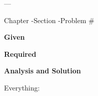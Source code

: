 \documentclass[10pt,letterpaper]{article}
\begin{document}
\begin{flushright}
\par
 --- \par
Chapter -Section -Problem \#
\end{flushright}

\noindent\textbf{\Large Given}\par


\vfil\noindent\textbf{\Large Required}\par
\begin{enumerate}[(a)]

\end{enumerate}

\vfil\noindent\textbf{\Large Analysis and Solution}\par
Everything:


\begin{enumerate}[(a)]

\end{enumerate}
\end{document}
